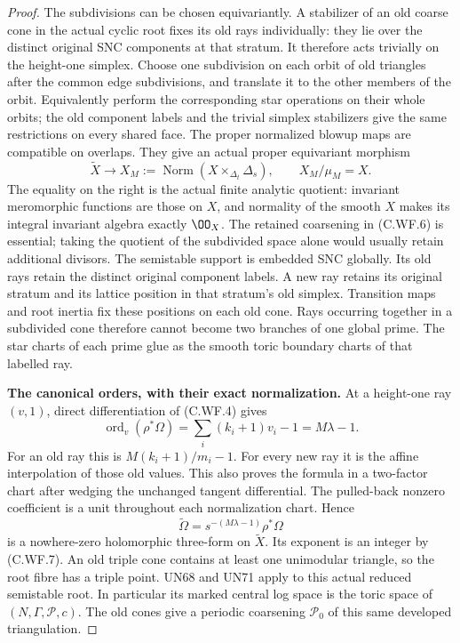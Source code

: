\begin{proof}
The subdivisions can be chosen equivariantly.  A stabilizer of an old
coarse cone in the actual cyclic root fixes its old rays
individually: they lie over the distinct original SNC
components at that stratum.  It therefore acts trivially on
the height-one simplex.  Choose one subdivision on each orbit
of old triangles after the common edge subdivisions, and
translate it to the other members of the orbit.  Equivalently
perform the corresponding star operations on their whole
orbits; the old component labels and the trivial simplex
stabilizers give the same restrictions on every shared face.
The proper normalized blowup maps are compatible on overlaps.  They give
an actual proper equivariant morphism
\[
 \widetilde X\longrightarrow X_M
       :=\operatorname{Norm}(X\times_{\Delta_t}\Delta_s),
 \qquad X_M/\mu_M=X.
\tag{C.WF.6}
\]
The equality on the right is the actual finite analytic
quotient: invariant meromorphic functions are those on \(X\),
and normality of the smooth \(X\) makes its integral invariant
algebra exactly \(\OO_X\).  The retained coarsening in
(C.WF.6) is essential; taking the quotient of the subdivided
space alone would usually retain additional divisors.
The semistable support is embedded SNC globally.  Its old
rays retain the distinct original component labels.  A new
ray retains its original stratum and its lattice position
in that stratum's old simplex.  Transition maps and root
inertia fix these positions on each old cone.  Rays occurring
together in a subdivided cone therefore cannot become two
branches of one global prime.  The star charts of each
prime glue as the smooth toric boundary charts of that
labelled ray.

\par\medskip\noindent\textbf{The canonical orders, with their exact normalization.}
At a height-one ray \((v,1)\), direct differentiation of
(C.WF.4) gives
\[
 \operatorname{ord}_{v}(\rho^*\Omega)
       =\sum_i(k_i+1)v_i-1
       =M\lambda-1.
\tag{C.WF.7}
\]
For an old ray this is \(M(k_i+1)/m_i-1\).
For every new ray it is the affine interpolation of those
old values.  This also proves the formula in a two-factor
chart after wedging the unchanged tangent differential.
The pulled-back nonzero coefficient is a unit throughout
each normalization chart.  Hence
\[
       \widetilde\Omega
          =s^{-(M\lambda-1)}\rho^*\Omega
\tag{C.WF.8}
\]
is a nowhere-zero holomorphic three-form on \(\widetilde X\).
Its exponent is an integer by (C.WF.7).
An old triple cone contains at least one unimodular triangle,
so the root fibre has a triple point.  UN68 and UN71 apply to
this actual reduced semistable root.  In particular its marked
central log space is the toric space of
\((N,\Gamma,\mathscr P,c)\).  The old cones give a periodic
coarsening \(\mathscr P_0\) of this same developed triangulation.


\end{proof}
